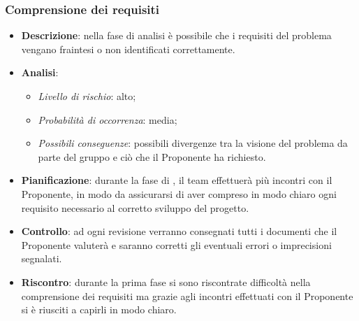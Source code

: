 		\subsubsection{Comprensione dei requisiti}
			\begin{itemize}
				\item \textbf{Descrizione}: nella fase di analisi è possibile che i requisiti del problema vengano fraintesi o non identificati correttamente. 
				\item \textbf{Analisi}:
				\begin{itemize}
					\item \textit{Livello di rischio}: alto;
					\item \textit{Probabilità di occorrenza}: media;
					\item \textit{Possibili conseguenze}: possibili divergenze tra la visione del problema da parte del gruppo e ciò che il Proponente ha richiesto.
				\end{itemize}
				\item \textbf{Pianificazione}: durante la fase di , il team effettuerà più incontri con il Proponente, in modo da assicurarsi di aver compreso in modo chiaro ogni requisito necessario al corretto sviluppo del progetto.
				\item \textbf{Controllo}: ad ogni revisione verranno consegnati tutti i documenti che il Proponente valuterà e saranno corretti gli eventuali errori o imprecisioni segnalati.
				\item \textbf{Riscontro}: durante la prima fase si sono riscontrate difficoltà nella comprensione dei requisiti ma grazie agli incontri effettuati con il Proponente si è riusciti a capirli in modo chiaro.
			\end{itemize}
